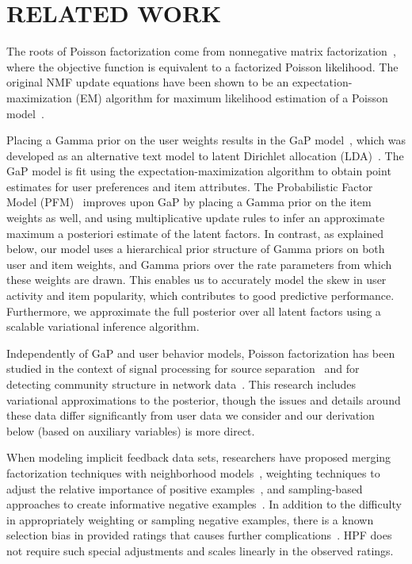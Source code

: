 \section{RELATED WORK}
\label{sec:related}
The roots of Poisson factorization come from nonnegative matrix
factorization~\cite{Lee:1999}, where the objective function is
equivalent to a factorized Poisson likelihood.  The original NMF
update equations have been shown to be an expectation-maximization
(EM) algorithm for maximum likelihood estimation of a Poisson
model~\cite{Cemgil:2009}.

Placing a Gamma prior on the user weights results in the GaP
model~\cite{Canny:2004}, which was developed as an alternative text
model to latent Dirichlet allocation
(LDA)~\cite{Blei:2003b,Inouye:2014}. The GaP model is fit using the
expectation-maximization algorithm to obtain point estimates for user
preferences and item attributes. The Probabilistic Factor Model
(PFM)~\cite{Ma:2011} improves upon GaP by placing a Gamma prior on the
item weights as well, and using multiplicative update rules to infer
an approximate maximum a posteriori estimate of the latent factors.
In contrast, as explained below, our model uses a hierarchical prior
structure of Gamma priors on both user and item weights, and Gamma
priors over the rate parameters from which these weights are
drawn. This enables us to accurately model the skew in user activity
and item popularity, which contributes to good predictive
performance. Furthermore, we approximate the full posterior over all
latent factors using a scalable variational inference algorithm.

Independently of GaP and user behavior models, Poisson factorization
has been studied in the context of signal processing for source
separation~\cite{Cemgil:2009,Hoffman:2012} and for
detecting community structure in network
data~\cite{Ball:2011,Gopalan:2013}. This research includes variational
approximations to the posterior, though the issues and details around
these data differ significantly from user data we consider and our
derivation below (based on auxiliary variables) is more direct.

When modeling implicit feedback data sets, researchers have proposed
merging factorization techniques with neighborhood
models~\cite{Koren:2008}, weighting techniques to adjust the relative
importance of positive examples~\cite{Hu:2008p9402}, and
sampling-based approaches to create informative negative
examples~\cite{Gantner:2012p9364,Dror:2012a,Paquet:2013p9197}.  In
addition to the difficulty in appropriately weighting or sampling
negative examples, there is a known selection bias in provided ratings
that causes further complications~\cite{Marlin:2012}.  HPF
does not require such special adjustments and scales linearly in the
observed ratings.

